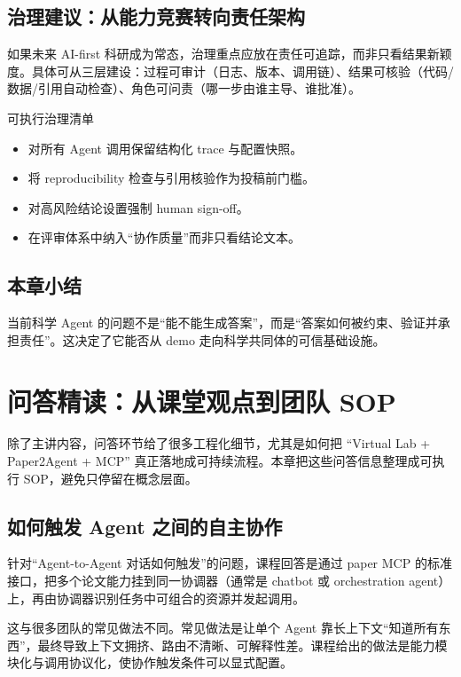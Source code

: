 \documentclass[a4paper]{article}
\begin{document}
\subsection{治理建议：从能力竞赛转向责任架构}

如果未来 AI-first 科研成为常态，治理重点应放在责任可追踪，而非只看结果新颖度。具体可从三层建设：过程可审计（日志、版本、调用链）、结果可核验（代码/数据/引用自动检查）、角色可问责（哪一步由谁主导、谁批准）。

\begin{importantbox}{可执行治理清单}
\begin{itemize}
    \item 对所有 Agent 调用保留结构化 trace 与配置快照。
    \item 将 reproducibility 检查与引用核验作为投稿前门槛。
    \item 对高风险结论设置强制 human sign-off。
    \item 在评审体系中纳入``协作质量''而非只看结论文本。
\end{itemize}
\end{importantbox}

\subsection{本章小结}

当前科学 Agent 的问题不是``能不能生成答案''，而是``答案如何被约束、验证并承担责任''。这决定了它能否从 demo 走向科学共同体的可信基础设施。

\section{问答精读：从课堂观点到团队 SOP}

除了主讲内容，问答环节给了很多工程化细节，尤其是如何把 ``Virtual Lab + Paper2Agent + MCP'' 真正落地成可持续流程。本章把这些问答信息整理成可执行 SOP，避免只停留在概念层面。

\subsection{如何触发 Agent 之间的自主协作}

针对``Agent-to-Agent 对话如何触发''的问题，课程回答是通过 paper MCP 的标准接口，把多个论文能力挂到同一协调器（通常是 chatbot 或 orchestration agent）上，再由协调器识别任务中可组合的资源并发起调用。

这与很多团队的常见做法不同。常见做法是让单个 Agent 靠长上下文``知道所有东西''，最终导致上下文拥挤、路由不清晰、可解释性差。课程给出的做法是能力模块化与调用协议化，使协作触发条件可以显式配置。
\end{document}
